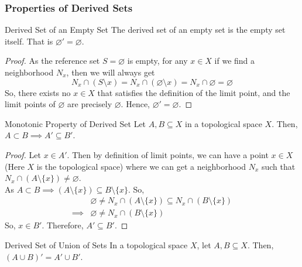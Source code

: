 \subsubsection{Properties of Derived Sets}
\begin{Theorem}{Derived Set of an Empty Set}\label{derived_set_empty_set}
    The derived set of an empty set is the empty set itself. That is $\varnothing'=\varnothing$.
\end{Theorem}
\begin{proof}
    As the reference set $S=\varnothing$ is empty, for any $x\in X$ if we find a neighborhood $N_x$, then we will always get $$N_x\cap(S\setminus x)=N_x\cap(\varnothing\setminus x)=N_x\cap\varnothing=\varnothing$$
    So, there exists no $x\in X$ that satisfies the definition of the limit point, and the limit points of $\varnothing$ are precisely $\varnothing$. Hence, $\varnothing'=\varnothing$.
\end{proof}
\begin{Theorem}{Monotonic Property of Derived Set}\label{monotonicity_of_derived_sets}
    Let $A, B\subseteq X$ in a topological space $X$. Then, $A\subset B\implies A'\subseteq B'$.
\end{Theorem}
\begin{proof}
    Let $x\in A'$. Then by definition of limit points, we can have a point $x\in X$ (Here $X$ is the topological space) where we can get a neighborhood $N_x$ such that $N_x\cap(A\setminus\{x\})\neq\varnothing$.\\
    As $A\subset B\implies (A\setminus\{x\})\subseteq B\setminus\{x\}$. So,
    \begin{align*}
        &\varnothing\neq N_x\cap(A\setminus\{x\})\subseteq N_x\cap(B\setminus\{x\})\\
        \implies&\varnothing\neq N_x\cap(B\setminus\{x\})
    \end{align*}
    So, $x\in B'$. Therefore, $A'\subseteq B'$.
\end{proof}
\begin{Theorem}{Derived Set of Union of Sets}\label{derived_set_of_union}
    In a topological space $X$, let $A, B\subseteq X$. Then, $(A\cup B)'=A'\cup B'$.
\end{Theorem}
